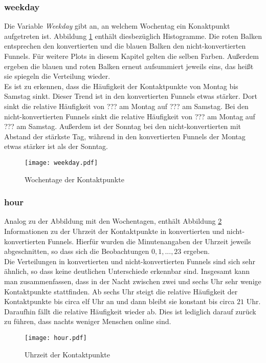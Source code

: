 \subsubsection*{weekday}
Die Variable \textit{Weekday} gibt an, an welchem Wochentag ein Konaktpunkt aufgetreten ist. Abbildung \ref{weekday} enthält diesbezüglich Histogramme. Die roten Balken entsprechen den konvertierten und die blauen Balken den nicht-konvertierten Funnels. Für weitere Plots in diesem Kapitel gelten die selben Farben. Außerdem ergeben die blauen und roten Balken erneut aufsummiert jeweils eins, das heißt sie spiegeln die Verteilung wieder.\\
Es ist zu erkennen, dass die Häufigkeit der Kontaktpunkte von Montag bis Samstag sinkt. Dieser Trend ist in den konvertierten Funnels etwas stärker. Dort sinkt die relative Häufigkeit von ??? am Montag auf ??? am Samstag. Bei den nicht-konvertierten Funnels sinkt die relative Häufigkeit von ??? am Montag auf ??? am Samstag. Außerdem ist der Sonntag bei den nicht-konvertierten mit Abstand der stärkste Tag, während in den konvertierten Funnels der Montag etwas stärker ist als der Sonntag.

\begin{figure}[H]
    \centering
    \texttt{[image: weekday.pdf]}
    \caption{Wochentage der Kontaktpunkte}
    \label{weekday}
\end{figure}

\subsubsection*{hour}
Analog zu der Abbildung mit den Wochentagen, enthält Abbildung \ref{hour} Informationen zu der Uhrzeit der Kontaktpunkte in konvertierten und nicht-konvertierten Funnels. Hierfür wurden die Minutenangaben der Uhrzeit jeweils abgeschnitten, so dass sich die Beobachtungen $0,1,...,23$ ergeben.\\
Die Verteilungen in konvertierten und nicht-konvertierten Funnels sind sich sehr ähnlich, so dass keine deutlichen Unterschiede erkennbar sind. Insgesamt kann man zusammenfassen, dass in der Nacht zwischen zwei und sechs Uhr sehr wenige Kontaktpunkte stattfinden. Ab sechs Uhr steigt die relative Häufigkeit der Kontaktpunkte bis circa elf Uhr an und dann bleibt sie konstant bis circa $21$ Uhr. Daraufhin fällt die relative Häufigkeit wieder ab. Dies ist lediglich darauf zurück zu führen, dass nachts weniger Menschen online sind.

\begin{figure}[H]
    \centering
    \texttt{[image: hour.pdf]}
    \caption{Uhrzeit der Kontaktpunkte}
    \label{hour}
\end{figure}

